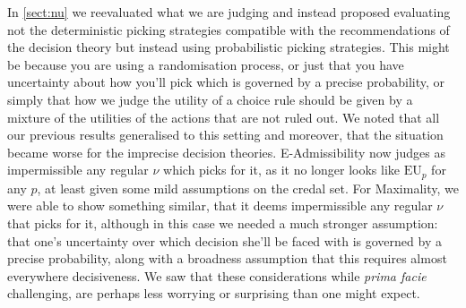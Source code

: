 \documentclass[a4paper]{article}
\newcommand\EU{\mathrm{EU}}
\renewcommand{\color}[1]{}
\newenvironment{CCM rewritten}
{\begingroup\color{blue}} %
{\endgroup}              %
\begin{document}

In \cref{sect:nu} we reevaluated what we are judging and instead proposed evaluating not the deterministic picking strategies compatible with the recommendations of the decision theory but instead using probabilistic picking strategies. This might be because you are using a randomisation process, or just that you have uncertainty about how you'll pick which is governed by a precise probability, or simply that how we judge the utility of a choice rule should be given by a mixture of the utilities of the actions that are not ruled out. 
We noted that all our previous results generalised to this setting and moreover, that the situation became worse for the imprecise decision theories. E-Admissibility now judges as impermissible any regular $\nu$ which picks for it, as it no longer looks like $\EU_p$ for any $p$, at least given some mild assumptions on the credal set. 
For Maximality, we were able to show something similar, that it deems impermissible any regular $\nu$ that picks for it, although in this case we needed a much stronger assumption: that one's uncertainty over which decision she'll be faced with is governed by a precise probability, along with a broadness assumption that this requires almost everywhere decisiveness. {\color{blue} We saw that these considerations while \textit{prima facie} challenging, are perhaps less worrying or surprising than one might expect.}
\end{document}
